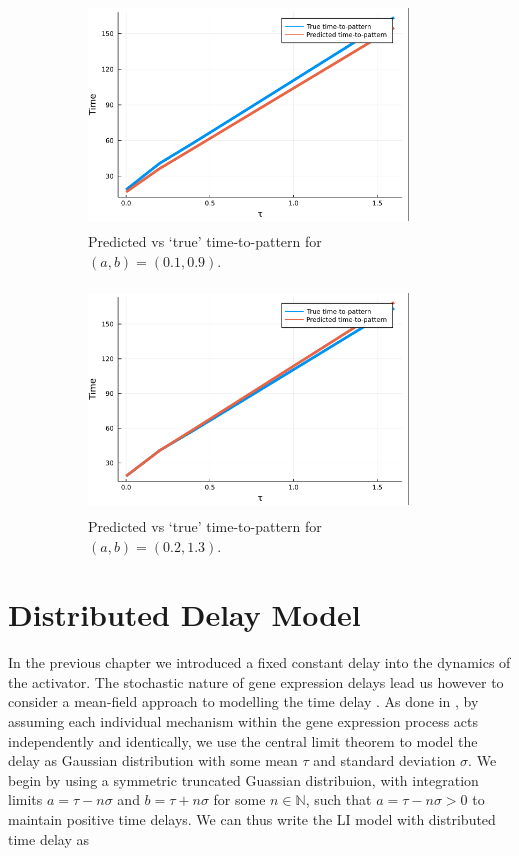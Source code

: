 \documentclass[12pt]{report}
\begin{document}
\begin{figure}[H]
    \centering
    \begin{subfigure}[b]{0.45\textwidth}
        \centering
        \includegraphics[width=8.5cm,height=6cm]{ttp2.png}
        \caption{Predicted vs `true' time-to-pattern for $(a,b)=(0.1,0.9)$.}
        \label{fig:ttp2}
    \end{subfigure}
    \hfill
    \begin{subfigure}[b]{0.45\textwidth}
        \centering
        \includegraphics[width=8.5cm,height=6cm]{ttp3.png}
        \caption{Predicted vs `true' time-to-pattern for $(a,b)=(0.2,1.3)$.}
        \label{fig:ttp3}
    \end{subfigure}
    \caption{}
    \label{}
\end{figure}

\newpage
\chapter{Distributed Delay Model}

In the previous chapter we introduced a fixed constant delay into the dynamics of the activator. The stochastic nature of gene expression delays lead us however to consider a mean-field approach to modelling the time delay \cite{bratsun,krausenew}. As done in \cite{william}, by assuming each individual mechanism within the gene expression process acts independently and identically, we use the central limit theorem to model the delay as Gaussian distribution with some mean $\tau$ and standard deviation $\sigma$. We begin by using a symmetric truncated Guassian distribuion, with integration limits $a=\tau-n\sigma$ and $b=\tau+n\sigma$ for some $n\in\mathbb{N}$, such that $a=\tau-n\sigma>0$ to maintain positive time delays. We can thus write the LI model with distributed time delay as
\end{document}
